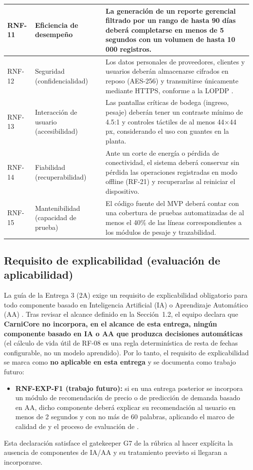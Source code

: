 \documentclass[11pt,a4paper]{article}
\begin{document}
\begin{longtable}{|p{1.4cm}|p{3cm}|p{9.5cm}|}
\hline
RNF-11 & Eficiencia de desempeño & La generación de un reporte gerencial filtrado por un rango de hasta 90 días deberá completarse en menos de 5 segundos con un volumen de hasta 10\,000 registros. \\
\hline
RNF-12 & Seguridad (confidencialidad) & Los datos personales de proveedores, clientes y usuarios deberán almacenarse cifrados en reposo (AES-256) y transmitirse únicamente mediante HTTPS, conforme a la LOPDP \cite{lopd2021}. \\
\hline
RNF-13 & Interacción de usuario (accesibilidad) & Las pantallas críticas de bodega (ingreso, pesaje) deberán tener un contraste mínimo de 4.5:1 y controles táctiles de al menos 44$\times$44 px, considerando el uso con guantes en la planta. \\
\hline
RNF-14 & Fiabilidad (recuperabilidad) & Ante un corte de energía o pérdida de conectividad, el sistema deberá conservar sin pérdida las operaciones registradas en modo offline (RF-21) y recuperarlas al reiniciar el dispositivo. \\
\hline
RNF-15 & Mantenibilidad (capacidad de prueba) & El código fuente del MVP deberá contar con una cobertura de pruebas automatizadas de al menos el 40\% de las líneas correspondientes a los módulos de pesaje y trazabilidad. \\
\hline
\end{longtable}

\subsection{Requisito de explicabilidad (evaluación de aplicabilidad)}
La guía de la Entrega 3 (2A) exige un requisito de explicabilidad obligatorio para todo componente basado en Inteligencia Artificial (IA) o Aprendizaje Automático (AA) \cite{chazette2020explainability,chazette2021exploring,chazette2022explainable}. Tras revisar el alcance definido en la Sección~1.2, el equipo declara que \textbf{CarniCore no incorpora, en el alcance de esta entrega, ningún componente basado en IA o AA que produzca decisiones automáticas} (el cálculo de vida útil de RF-08 es una regla determinística de resta de fechas configurable, no un modelo aprendido). Por lo tanto, el requisito de explicabilidad se marca como \textbf{no aplicable en esta entrega} y se documenta como trabajo futuro:

\begin{itemize}[nosep]
\item \textbf{RNF-EXP-F1 (trabajo futuro):} si en una entrega posterior se incorpora un módulo de recomendación de precio o de predicción de demanda basado en AA, dicho componente deberá explicar su recomendación al usuario en menos de 2 segundos y con no más de 60 palabras, aplicando el marco de calidad de \cite{chazette2021exploring} y el proceso de evaluación de \cite{chazette2022explainable}.
\end{itemize}
Esta declaración satisface el gatekeeper G7 de la rúbrica al hacer explícita la ausencia de componentes de IA/AA y su tratamiento previsto si llegaran a incorporarse.
\end{document}
